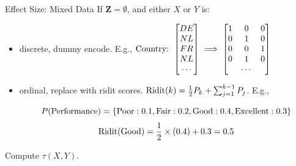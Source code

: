 \documentclass{beamer}
\begin{document}
\begin{frame}{Effect Size: Mixed Data}	
	If $ \bm{Z} = \emptyset $, and either $ X $ or $ Y $ is:
	\begin{itemize}
		\item discrete, dummy encode. E.g., $\textnormal{Country: } \begin{bmatrix} DE \\
					   NL \\
				           FR \\
				           NL \\
					   \cdots
					   \end{bmatrix} \implies \begin{bmatrix} 1 & 0 & 0 \\
				   						  0 & 1 & 0 \\
									          0 & 0 & 1 \\
									          0 & 1 & 0 \\
										    & \cdots &
									  \end{bmatrix}$
		\item ordinal, replace with ridit scores. $ \textnormal{Ridit}(k) = \frac{1}{2} P_k + \sum_{j=1}^{k-1} P_j $. E.g.,

			$$ P(\textnormal{Performance}) = \{\textnormal{Poor}: 0.1, \textnormal{Fair}: 0.2, \textnormal{Good}: 0.4, \textnormal{Excellent}: 0.3 \} $$
			$$ \textnormal{Ridit}(\textnormal{Good}) = \frac{1}{2} \times (0.4) + 0.3 = 0.5 $$
				
	\end{itemize}
\vspace{1em}
Compute $ \tau(X, Y) $.
\end{frame}
\end{document}
